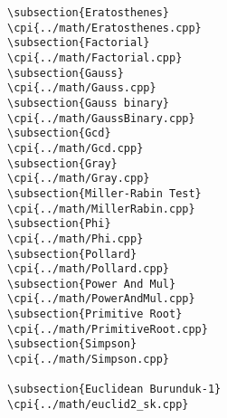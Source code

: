 {\begin{verbatim}
\subsection{Eratosthenes}
\cpi{../math/Eratosthenes.cpp}
\subsection{Factorial}
\cpi{../math/Factorial.cpp}
\subsection{Gauss}
\cpi{../math/Gauss.cpp}
\subsection{Gauss binary}
\cpi{../math/GaussBinary.cpp}
\subsection{Gcd}
\cpi{../math/Gcd.cpp}
\subsection{Gray}
\cpi{../math/Gray.cpp}
\subsection{Miller-Rabin Test}
\cpi{../math/MillerRabin.cpp}
\subsection{Phi}
\cpi{../math/Phi.cpp}
\subsection{Pollard}
\cpi{../math/Pollard.cpp}
\subsection{Power And Mul}
\cpi{../math/PowerAndMul.cpp}
\subsection{Primitive Root}
\cpi{../math/PrimitiveRoot.cpp}
\subsection{Simpson}
\cpi{../math/Simpson.cpp}

\subsection{Euclidean Burunduk-1}
\cpi{../math/euclid2_sk.cpp}

\end{verbatim}}
